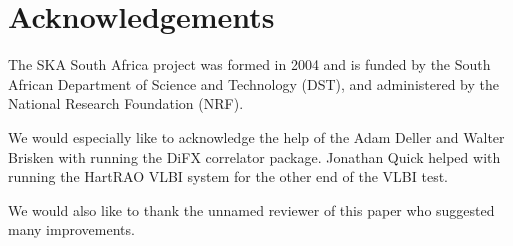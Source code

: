 \section{Acknowledgements}

\noindent
The SKA South Africa project was formed in 2004 and is funded by
the South African Department of Science and Technology (DST), and
administered by the National Research Foundation (NRF).

We would especially like to acknowledge the help of the Adam Deller
and Walter Brisken with running the DiFX correlator package. Jonathan
Quick helped with running the HartRAO VLBI system for the other end of
the VLBI test.

We would also like to thank the unnamed reviewer of this paper who
suggested many improvements.

